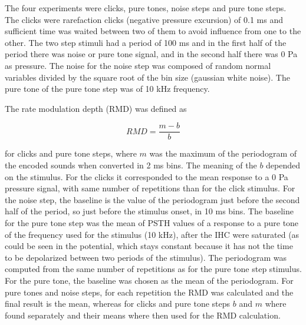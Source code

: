 The four experiments were clicks, pure tones, noise steps and pure tone steps.
The clicks were rarefaction clicks (negative pressure excursion) of 0.1 ms and sufficient time was waited between 
two of them to avoid influence from one to the other.
The two step stimuli had a period of 100 ms and in the first half of the period 
there was noise or pure tone signal, and in the second half there was 0 Pa as pressure.
The noise for the noise step was composed of random normal variables divided 
by the square root of the bin size (gaussian white noise).
The pure tone of the pure tone step was of 10 kHz frequency.

The rate modulation depth (RMD) was defined as 

\begin{equation}\label{rmdformula1} RMD =  \frac{m - b}{b}\end{equation}

%
%
for clicks and pure tone steps,
where $m$ was 
the maximum of the periodogram of the encoded sounds when converted in 2 ms bins.
The meaning of the $b$ depended on the stimulus. 
For the clicks it corresponded to the mean response to a 0 Pa pressure signal,
 with same number of repetitions than for the click stimulus. 
For the noise step, the baseline is the value of the periodogram just before the second 
half of the period, so just before the stimulus onset,
 in 10 ms bins. 
The baseline for the pure tone step was the mean of PSTH values
of a response to a pure tone of the frequency used for the stimulus (10 kHz),
after the IHC were saturated (as could be seen in the potential, 
which stays constant because it has not the time 
to be depolarized between two periods of the stimulus). 
The periodogram was computed from the same number of repetitions as for the pure tone step stimulus.
For the pure tone, the baseline was chosen as the mean of the periodogram.
For pure tones and noise steps, for each repetition the RMD was calculated and the final result is the mean, whereas
for clicks and pure tone steps $b$ and $m$ where found separately and their means where then used for the RMD calculation.

